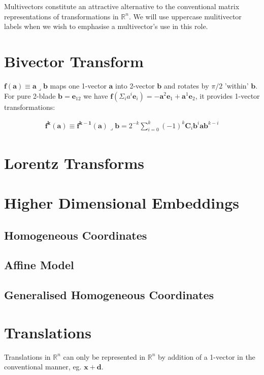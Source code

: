 \documentclass[a4paper]{book}
\numberwithin{equation}{chapter}
\begin{document}
Multivectors constitute an attractive alternative to the conventional matrix representations of transformations in $\mathbb{R}^n$. We will use uppercase mulitivector labels when we wish to emphasise a multivector's use in this role. 

    \section{Bivector Transform}

$\mathbf{f(a)}\equiv \mathbf{a} \lrcorner \mathbf{b}$ maps one 1-vector 
$\mathbf{a}$ into 2-vector $\mathbf{b}$ and rotates by $\pi/2$ 'within'
$\mathbf{b}$. For pure 2-blade $\mathbf{b}=\mathbf{e}_{12}$ we have
$\mathbf{f}(\Sigma_i a^i \mathbf{e}_i) = -\mathbf{a}^2\mathbf{e}_1+\mathbf{a}^1
\mathbf{e}_2$, it provides 1-vector transformations:

\begin{align*}
    \mathbf{f^k(a)} \equiv \mathbf{f^{k-1}(a)}\lrcorner\mathbf{b} = 
    2^{-k}\sum_{i=0}^k (-1)^k \mathbf{C}_i \mathbf{b}^i \mathbf{a} \mathbf{b}^{k-i}
\end{align*}

    \section{Lorentz Transforms}


    \section{Higher Dimensional Embeddings}

    \subsection{Homogeneous Coordinates}
    \subsection{Affine Model}
    \subsection{Generalised Homogeneous Coordinates}
    
    
    \section{Translations}

Translations in $\mathbb{R}^n$ can only be represented in 
$\mathbb{R}^n$ by addition of a 1-vector in the conventional manner, eg.
$\mathbf{x+d}$.
\end{document}
